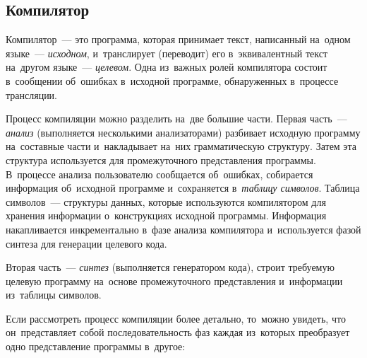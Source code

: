 \subsection{Компилятор} \label{sub111}

Компилятор~--- это программа, которая  принимает текст, написанный на~одном языке~--- \textit{исходном}, и~транслирует (переводит) его в~эквивалентный текст на~другом языке~--- \textit{целевом}. Одна из~важных ролей компилятора состоит в~сообщении об~ошибках в~исходной программе, обнаруженных в~процессе трансляции.

Процесс компиляции можно разделить на~две большие части. Первая часть~--- \textit{анализ} (выполняется несколькими анализаторами) разбивает исходную программу на~составные части и~накладывает на~них грамматическую структуру. Затем эта структура используется для промежуточного представления программы. В~процессе анализа пользователю сообщается об~ошибках, собирается информация об~исходной программе и~сохраняется в~\textit{таблицу символов}. Таблица символов~--- структуры данных, которые используются компилятором для хранения информации о~конструкциях исходной программы. Информация накапливается инкрементально в~фазе анализа компилятора и~используется фазой синтеза для генерации целевого кода.

Вторая часть~--- \textit{синтез} (выполняется генератором кода), строит требуемую целевую программу на~основе промежуточного представления и~информации из~таблицы символов.

Если рассмотреть процесс компиляции более детально, то~можно увидеть, что он~представляет собой последовательность фаз каждая из~которых преобразует одно представление программы в~другое:

